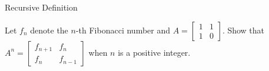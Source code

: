\documentclass{beamer}
\begin{document}
\begin{frame}[t]{Recursive Definition}
    \begin{example}
        Let $f_n$ denote the $n$-th Fibonacci number and $A = \begin{bmatrix}
            1 & 1 \\ 1 & 0
        \end{bmatrix}$. Show that $A^n = \begin{bmatrix}
            f_{n+1} & f_n \\ f_n & f_{n-1}
        \end{bmatrix}$ when $n$ is a positive integer. 
    \end{example}
\end{frame}
\end{document}
